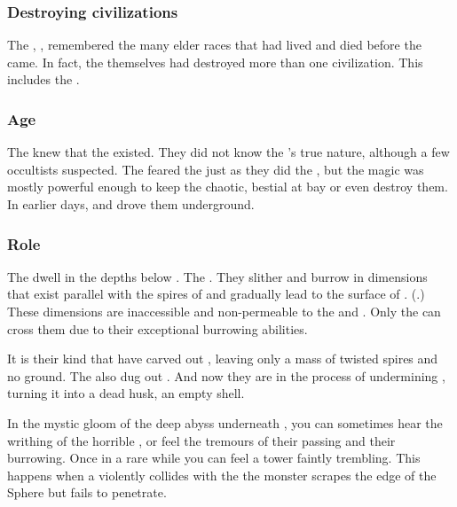 \subsubsection{Destroying civilizations}
The \noggyaleth, , remembered the many elder races that had lived and died before the \ophidians came.
In fact, the \noggyaleth themselves had destroyed more than one civilization. 
This includes the . 





\subsubsection{\Ophidian Age}
The \ophidians knew that the \noggyaleth existed. 
They did not know the \noggyaleth's true nature, although a few occultists suspected.
The \ophidians feared the \noggyaleth just as they did the \xss, but the \ophidian magic was mostly powerful enough to keep the chaotic, bestial \noggyaleth at bay or even destroy them.
In earlier days,  and drove them underground.





\subsubsection{Role}
The \noggyaleth{} dwell in the depths below \Nyx. 
The . 
They slither and burrow in dimensions that exist parallel with the spires of \Nyx{} and gradually lead to the surface of \Erebos. 
(.)
These dimensions are inaccessible and non-permeable to the \resphain{} and \banes. 
Only the \noggyaleth{} can cross them due to their exceptional burrowing abilities. 

It is their kind that have carved out \Erebos, leaving only a mass of twisted spires and no ground. 
The also dug out \Nyx. And now they are in the process of undermining \Miith{}, turning it into a dead husk, an empty shell. 

In the mystic gloom of the deep abyss underneath \Nyx, you can sometimes hear the writhing of the horrible , or feel the tremours of their passing and their burrowing.
Once in a rare while you can feel a tower faintly trembling. 
This happens when a \noggyal{} violently collides with the \CrystalSphere{}\dash the monster scrapes the edge of the Sphere but fails to penetrate. 






